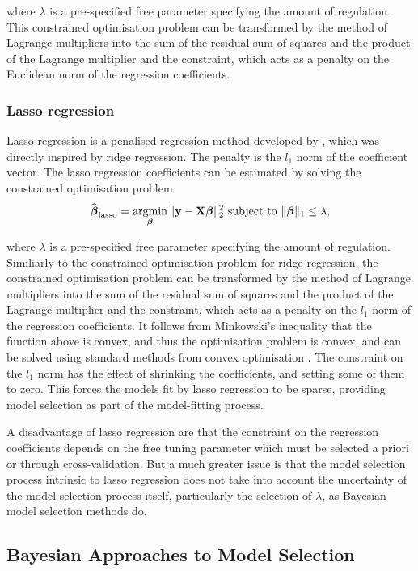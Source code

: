 where $\lambda$ is a pre-specified free parameter specifying the amount of
regulation. This constrained optimisation problem can be transformed by the
method of Lagrange multipliers into the sum of the residual sum of squares and
the product of the Lagrange multiplier and the constraint, which acts as a
penalty on the Euclidean norm of the regression coefficients.


\subsubsection{Lasso regression}

Lasso regression is a penalised regression method developed by
\citep{Tibshirani1996}, which was directly inspired by ridge regression.  The
penalty is the $l_1$ norm of the coefficient vector.  The lasso regression
coefficients can be estimated by solving the constrained optimisation problem
$$
\widehat{\vbeta}_{\text{lasso}} = \argmin_\vbeta \|\vy - \mX \vbeta\|_2^2 \text{ subject to } \|\vbeta\|_1 \leq \lambda,
$$

where $\lambda$ is a pre-specified free parameter specifying the amount of
regulation. Similiarly to the constrained optimisation problem for ridge
regression, the constrained optimisation problem can be transformed by the
method of Lagrange multipliers into the sum of the residual sum of squares and
the product of the Lagrange multiplier and the constraint, which acts as a
penalty on the $l_1$ norm of the regression coefficients. It follows from
Minkowski's inequality that the function above is convex, and thus the
optimisation problem is convex, and can be solved using standard methods from
convex optimisation \citep{Boyd2010}.  The constraint on the $l_1$ norm has the
effect of shrinking the coefficients, and setting some of them to zero. This
forces the models fit by lasso regression to be sparse, providing model
selection as part of the model-fitting process.

A disadvantage of lasso regression are that the constraint on the regression
coefficients depends on the free tuning parameter which must be selected a
priori or through cross-validation. But a much greater issue is that the model
selection process intrinsic to lasso regression does not take into account the
uncertainty of the model selection process itself, particularly the selection of
$\lambda$, as Bayesian model selection methods do.

\subsection{Bayesian Approaches to Model Selection}

